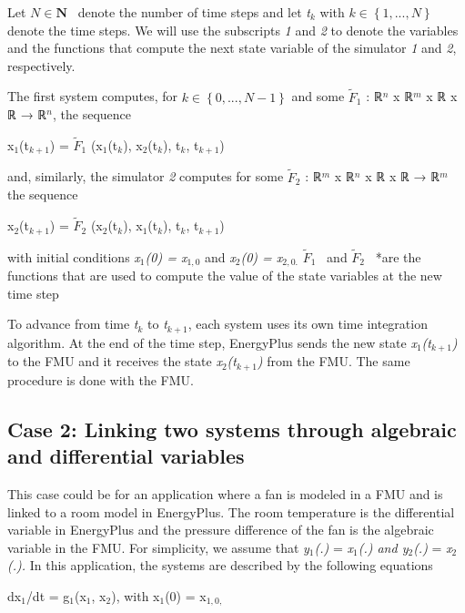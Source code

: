 Let \(N\in\textbf{N}\) ~denote the number of time steps and let \emph{t\(_{k}\)} with \(k\in\left\{1,...,N\right\}\) denote the time steps. We will use the subscripts \emph{1} and \emph{2} to denote the variables and the functions that compute the next state variable of the simulator \emph{1} and \emph{2}, respectively.

The first system computes, for \(k\in\left\{0,...,N-1\right\}\) and some \(\tilde{F}_1\) : ℝ\(^{n}\) x ℝ\(^{m}\) x ℝ x ℝ → ℝ\(^{n}\), the sequence

x\(_{1}\)(t\(_{k+1}\)) = \(\tilde{F}_1\) (x\(_{1}\)(t\(_{k}\)), x\(_{2}\)(t\(_{k}\)), t\(_{k}\), t\(_{k+1}\))

and, similarly, the simulator \emph{2} computes for some \(\tilde{F}_2\) : ℝ\(^{m}\) x ℝ\(^{n}\) x ℝ x ℝ → ℝ\(^{m}\) the sequence

x\(_{2}\)(t\(_{k+1}\)) = \(\tilde{F}_2\) (x\(_{2}\)(t\(_{k}\)), x\(_{1}\)(t\(_{k}\)), t\(_{k}\), t\(_{k+1}\))

with initial conditions \emph{x\(_{1}\)(0) = x\(_{1,0}\)} and \emph{x\(_{2}\)(0) = x\(_{2,0.}\)} \(\tilde{F}_1\) ~and \(\tilde{F}_2\) ~*are the functions that are used to compute the value of the state variables at the new time step

To advance from time \emph{t\(_{k}\)} to \emph{t\(_{k+1}\)}, each system uses its own time integration algorithm. At the end of the time step, EnergyPlus sends the new state \emph{x\(_{1}\)(t\(_{k+1}\))} to the FMU and it receives the state \emph{x\(_{2}\)(t\(_{k+1}\))} from the FMU. The same procedure is done with the FMU.

\subsection{Case 2: Linking two systems through algebraic and differential variables}\label{case-2-linking-two-systems-through-algebraic-and-differential-variables}

This case could be for an application where a fan is modeled in a FMU and is linked to a room model in EnergyPlus. The room temperature is the differential variable in EnergyPlus and the pressure difference of the fan is the algebraic variable in the FMU. For simplicity, we assume that \emph{y\(_{1}\)(.)} = \emph{x\(_{1}\)(.) and y\(_{2}\)(.)} = \emph{x\(_{2}\)(.).} In this application, the systems are described by the following equations

dx\(_{1}\)/dt = g\(_{1}\)(x\(_{1}\), x\(_{2}\)), with x\(_{1}\)(0) = x\(_{1,0,}\)

